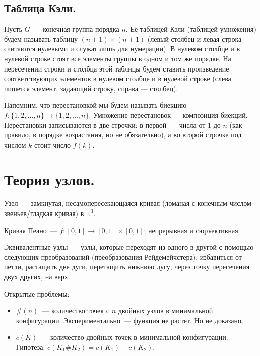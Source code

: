 \documentclass[12pt]{article}
\begin{document}
	\subsection{Таблица Кэли.}
	\begin{definition}
		Пусть $G$~--- конечная группа порядка $n$. Её таблицей Кэли (таблицей умножения) будем называть таблицу $(n + 1) \times (n + 1)$ (левый столбец и левая строка считаются нулевыми и служат лишь для нумерации). В нулевом столбце и в нулевой строке стоят все элементы группы в одном и том же порядке. На пересечении строки и столбца этой таблицы будем ставить произведение соответствующих элементов в нулевом столбце и в нулевой строке (слева пишется элемент, задающий строку, справа — столбец).
	\end{definition}
	\begin{definition}
		Напомним, что перестановкой мы будем называть биекцию $f: \{ 1, 2, \dots, n \} \rightarrow \{ 1, 2, \dots, n \}$. Умножение перестановок — композиция биекций. Перестановки записываются в две строчки: в первой~--- числа от $1$ до $n$ (как правило, в порядке возрастания, но не обязательно), а во второй строчке под числом $k$ стоит число $f(k)$.
	\end{definition}
	\section{Теория узлов.}
	\begin{definition}
		Узел~--- замкнутая, несамопересекающаяся кривая (ломаная с конечным числом звеньев/гладкая кривая) в $\mathbb{R}^3$.
	\end{definition}
	\begin{definition}
		Кривая Пеано~--- $f: [0, 1] \rightarrow [0, 1] \times [0, 1]$; непрерывная и сюръективная.
	\end{definition}
	\begin{definition}
		Эквивалентные узлы~--- узлы, которые переходят из одного в другой с помощью следующих преобразований (преобразования Рейдемейчстера): избавиться от петли, растащить две дуги, перетащить нижнюю дугу, через точку пересечения двух других, на верх.
	\end{definition}
	\begin{note}
		Открытые проблемы:
		\begin{itemize}
			\item $\# (n)$~--- количество точек с $n$ двойных узлов в минимальной конфигурации. Экспериментально~--- функция не растет. Но не доказано.
			\item $c(K)$~--- количество двойных точек в минимальной конфигурации. Гипотеза: $c(K_1 \# K_2) = c(K_1) + c(K_2)$.
		\end{itemize}
	\end{note}
\end{document}
